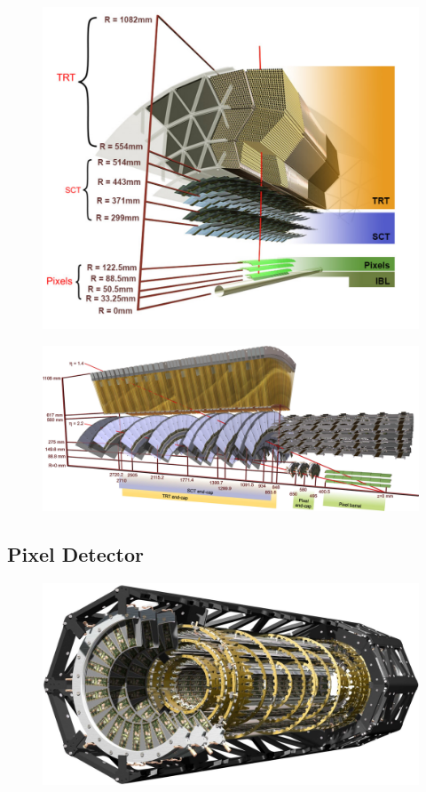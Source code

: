 \begin{figure}[hbtp]
\includegraphics[width=\fullfig]{figures/id_slice.png}
\caption{}
\label{fig:id_slice}
\end{figure}


\begin{figure}[hbtp]
\includegraphics[width=\fullfig]{figures/id_slice_long.pdf}
\caption{}
\label{fig:id_slice_long}
\end{figure}


\subsection{Pixel Detector}
\label{sec:pixel}

\begin{figure}[hbtp]
\includegraphics[width=\fullfig]{figures/pixel_overview.pdf}
\caption{}
\label{fig:pixel_overview}
\end{figure}

